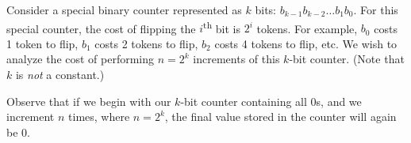 
\clearpage
{}

Consider a special binary counter represented as $k$ bits: $b_{k-1}
b_{k-2} \ldots b_1 b_0$. For this special counter, the cost of
flipping the $i$\textsuperscript{th} bit is $2^i$ tokens. For example, $b_0$
costs 1 token to flip, $b_1$ costs 2 tokens to flip, $b_2$ costs 4
tokens to flip, etc.  We wish to analyze the cost of performing $n =
2^k$ increments of this $k$-bit counter. (Note that $k$ is \emph{not}
a constant.)

Observe that if we begin with our $k$-bit counter containing all 0s,
and we increment $n$ times, where $n = 2^k$, the final value stored in
the counter will again be 0.

